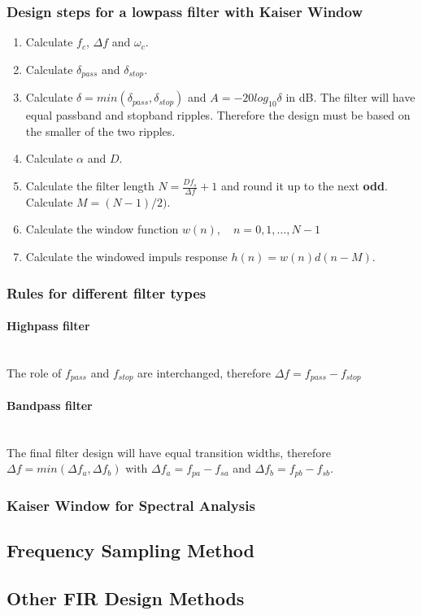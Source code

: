 \subsubsection{Design steps for a lowpass filter with Kaiser Window}
\begin{enumerate}
\item Calculate $f_c$, $\Delta f$ and $\omega_c$.
\item Calculate $\delta_{pass}$ and $\delta_{stop}$.
\item Calculate $\delta=min(\delta_{pass},\delta_{stop})$ and $A=-20log_{10}\delta$ in dB. \newline
	  The filter will have equal passband and stopband ripples. Therefore the design must be based on the smaller of the two ripples.
\item Calculate $\alpha$ and $D$.
\item Calculate the filter length $N=\frac{Df_s}{\Delta f}+1$ and round it up to the next \textbf{odd}. Calculate $M=(N-1)/2)$.
\item Calculate the window function $w(n),\quad n=0,1,\dots,N-1$
\item Calculate the windowed impuls response $h(n)=w(n)d(n-M)$.
\end{enumerate}

\subsubsection{Rules for different filter types}
\paragraph{Highpass filter}~\\
The role of $f_{pass}$ and $f_{stop}$ are interchanged, therefore $\Delta f = f_{pass}-f_{stop}$
\paragraph{Bandpass filter}~\\
The final filter design will have equal transition widths, therefore $\Delta f = min(\Delta f_a, \Delta f_b)$ with $\Delta f_a=f_{pa}-f_{sa}$ and $\Delta f_b=f_{pb}-f_{sb}$.

\subsubsection{Kaiser Window for Spectral Analysis}

\subsection{Frequency Sampling Method}

\subsection{Other FIR Design Methods}

